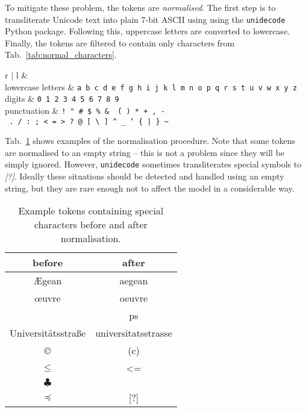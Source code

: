 \documentclass{IIBproject}
\begin{document}
To mitigate these problem, the tokens are \emph{normalised}. The first step is to transliterate Unicode text into plain 7-bit ASCII using using the \texttt{unidecode} Python package.\cite{lib:unidecode} Following this, uppercase letters are converted to lowercase. Finally, the tokens are filtered to contain only characters from Tab.~\ref{tab:normal_characters}.

\begin{table}[h]
	\centering
	\begin{tabular}{r | l}
	 &  \\
	\hline
	lowercase letters & \texttt{\footnotesize a b c d e f g h i j k l m n o p q r s t u v w x y z} \\
	digits & \texttt{\footnotesize 0 1 2 3 4 5 6 7 8 9} \\
	punctuation & \texttt{\footnotesize !\ "\ \#\ \$\ \%\ \&\ \'\ (\ )\ *\ +\ ,\ -\ .\ /\ :\ ;\ <\ =\ >\ ?\ @\ [\ \textbackslash\ ]\ \textasciicircum\ \_\ `\ \{\ |\ \}\ \textasciitilde}
	\end{tabular}
	\caption{\label{tab:normal_characters}Characters that can be a part of a normalised token.}
\end{table}

Tab.~\ref{tab:normalisation_examples} shows examples of the normalisation procedure. Note that some tokens are normalised to an empty string -- this is not a problem since they will be simply ignored. However, \texttt{unidecode} sometimes transliterates special symbols to \emph{[?]}. Ideally these situations should be detected and handled using an empty string, but they are rare enough not to affect the model in a considerable way.

\begin{table}[h]
	\centering
	\begin{tabular}{c | c}
	before & after \\
	\hline
	Ægean & aegean \\
	œuvre & oeuvre \\
	\textsterling & ps \\
	Universitätsstraße & universitatsstrasse \\
	\copyright & (c) \\
	$\leq$ & \textless= \\
	$\clubsuit$ & \\
	$\preccurlyeq$ & [?]
	\end{tabular}
	\caption{\label{tab:normalisation_examples}Example tokens containing special characters before and after normalisation.}
\end{table}
\end{document}
